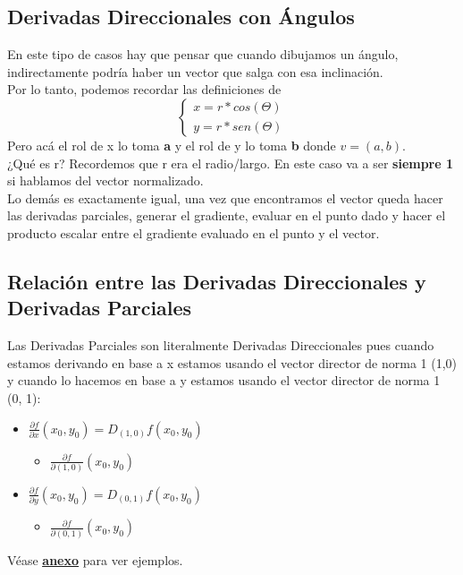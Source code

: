 \documentclass[10pt,a4paper]{article}
\begin{document}
\subsection*{Derivadas Direccionales con Ángulos}
En este tipo de casos hay que pensar que cuando dibujamos un ángulo, indirectamente podría haber un vector que salga con esa inclinación. \\
Por lo tanto, podemos recordar las definiciones de
\[
\begin{cases}
x = r * cos(\Theta) \\
y = r * sen(\Theta)
\end{cases}
\]
Pero acá el rol de x lo toma \textbf{a} y el rol de y lo toma \textbf{b} donde $v=(a,b)$. \\
¿Qué es r? Recordemos que r era el radio/largo. En este caso va a ser \textbf{siempre 1} si hablamos del vector normalizado. \\
Lo demás es exactamente igual, una vez que encontramos el vector queda hacer las derivadas parciales, generar el gradiente, evaluar en el punto dado y hacer el producto escalar entre el gradiente evaluado en el punto y el vector. 
\subsection*{Relación entre las Derivadas Direccionales y Derivadas Parciales}
Las Derivadas Parciales son literalmente Derivadas Direccionales pues cuando estamos derivando en base a x estamos usando el vector director de norma 1 (1,0) y cuando lo hacemos en base a y estamos usando el vector director de norma 1 (0, 1): 
\begin{itemize}
    \item $\frac{\partial f}{\partial x}(x_{0}, y_{0}) = D_{(1, 0)} f (x_{0}, y_{0})$
    \begin{itemize}
        \item $\frac{\partial f}{\partial(1,0)} (x_{0}, y_{0})$
    \end{itemize}
    \item $\frac{\partial f}{\partial y}(x_{0}, y_{0}) = D_{(0, 1)} f (x_{0}, y_{0})$
    \begin{itemize}
        \item $\frac{\partial f}{\partial(0, 1)} (x_{0}, y_{0})$
    \end{itemize}
\end{itemize}
Véase \hyperref[subsec:derivadas_direccionales_ej]{\textbf{\underline{anexo}}} para ver ejemplos.
\end{document}
